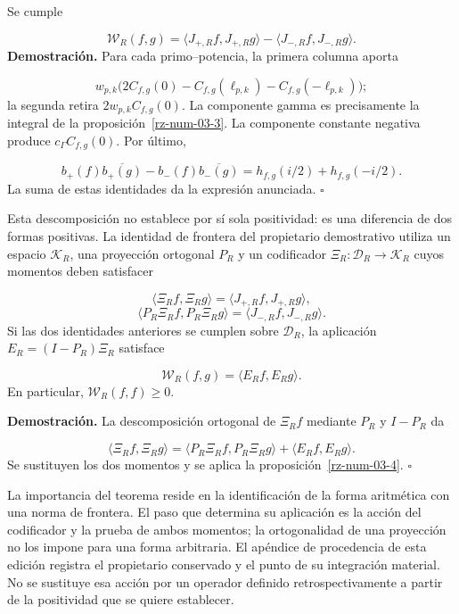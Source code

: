 Se cumple

\[
\mathscr W_R(f,g)
=\langle J_{+,R}f,J_{+,R}g\rangle
-\langle J_{-,R}f,J_{-,R}g\rangle.
\]
\textbf{Demostración.} Para cada primo–potencia, la primera columna aporta

\[
w_{p,k}\bigl(2C_{f,g}(0)
-C_{f,g}(\ell_{p,k})-C_{f,g}(-\ell_{p,k})\bigr);
\]
la segunda retira \(2w_{p,k}C_{f,g}(0)\). La componente gamma es precisamente la integral de la proposición~\ref{rz-num-03-3}. La componente constante negativa produce \(c_\Gamma C_{f,g}(0)\). Por último,

\[
b_+(f)\overline{b_+(g)}-b_-(f)\overline{b_-(g)}
=h_{f,g}(i/2)+h_{f,g}(-i/2).
\]
La suma de estas identidades da la expresión anunciada. \hfill\(\square\)

Esta descomposición no establece por sí sola positividad: es una diferencia de dos formas positivas. La identidad de frontera del propietario demostrativo utiliza un espacio \(\mathcal K_R\), una proyección ortogonal \(P_R\) y un codificador \(\Xi_R:\mathcal D_R\to\mathcal K_R\) cuyos momentos deben satisfacer

\[
\langle\Xi_Rf,\Xi_Rg\rangle
=\langle J_{+,R}f,J_{+,R}g\rangle,
\]
\[
\langle P_R\Xi_Rf,P_R\Xi_Rg\rangle
=\langle J_{-,R}f,J_{-,R}g\rangle.
\]
Si las dos identidades anteriores se cumplen sobre \(\mathcal D_R\), la aplicación \(E_R=(I-P_R)\Xi_R\) satisface

\[
\mathscr W_R(f,g)=\langle E_Rf,E_Rg\rangle.
\]
En particular, \(\mathscr W_R(f,f)\geq0\).

\textbf{Demostración.} La descomposición ortogonal de \(\Xi_Rf\) mediante \(P_R\) y \(I-P_R\) da

\[
\langle\Xi_Rf,\Xi_Rg\rangle
=\langle P_R\Xi_Rf,P_R\Xi_Rg\rangle
+\langle E_Rf,E_Rg\rangle.
\]
Se sustituyen los dos momentos y se aplica la proposición~\ref{rz-num-03-4}. \hfill\(\square\)

La importancia del teorema reside en la identificación de la forma aritmética con una norma de frontera. El paso que determina su aplicación es la acción del codificador y la prueba de ambos momentos; la ortogonalidad de una proyección no los impone para una forma arbitraria. El apéndice de procedencia de esta edición registra el propietario conservado y el punto de su integración material. No se sustituye esa acción por un operador definido retrospectivamente a partir de la positividad que se quiere establecer.

